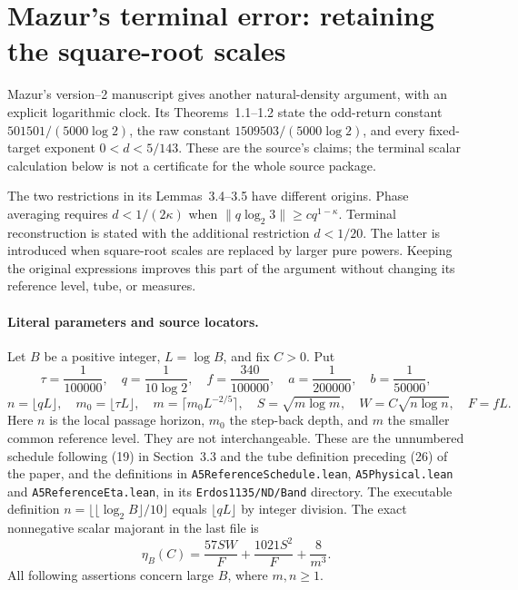 \documentclass[11pt]{article}
\theoremstyle{remark}\newtheorem{remark}[proposition]{Remark}
\begin{document}
\section{Mazur's terminal error: retaining the square-root scales}
\label{sec:mazur-terminal}

Mazur's version--2 manuscript \cite{Mazur2026v2} gives another
natural-density argument, with an explicit logarithmic clock. Its
Theorems~1.1--1.2 state the odd-return constant
$501501/(5000\log2)$, the raw constant $1509503/(5000\log2)$,
and every fixed-target exponent $0<d<5/143$. These are the source's
claims; the terminal scalar calculation below is not a certificate
for the whole source package.

The two restrictions in its Lemmas~3.4--3.5 have different origins.
Phase averaging requires $d<1/(2\kappa)$ when
$\|q\log_2 3\|\ge c q^{1-\kappa}$. Terminal reconstruction is
stated with the additional restriction $d<1/20$. The latter is
introduced when square-root scales are replaced by larger pure
powers. Keeping the original expressions improves this part of
the argument without changing its reference level, tube, or measures.

\paragraph{Literal parameters and source locators.}
Let $B$ be a positive integer, $L=\log B$, and fix $C>0$. Put
\[
 \tau=\frac1{100000},\quad q=\frac1{10\log2},\quad
 f=\frac{340}{100000},\quad
 a=\frac1{200000},\quad b=\frac1{50000},
\]
\[
 n=\lfloor qL\rfloor,\quad m_0=\lfloor\tau L\rfloor,\quad
 m=\lceil m_0L^{-2/5}\rceil,\quad
 S=\sqrt{m\log m},\quad W=C\sqrt{n\log n},\quad F=fL.
\]
Here $n$ is the local passage horizon, $m_0$ the step-back
depth, and $m$ the smaller common reference level. They are not
interchangeable. These are the unnumbered schedule following (19)
in Section~3.3 and the tube definition preceding (26) of the paper,
and the definitions in
\texttt{A5ReferenceSchedule.lean}, \texttt{A5Physical.lean}
and \texttt{A5ReferenceEta.lean}, in its
\texttt{Erdos1135/ND/Band} directory.
The executable definition $n=\lfloor\lfloor\log_2 B\rfloor/10\rfloor$
equals $\lfloor qL\rfloor$ by integer division.
The exact nonnegative scalar majorant in the last file is
\begin{equation}
 \eta_B(C)=\frac{57SW}{F}+\frac{1021S^2}{F}+\frac8{m^3}.
 \label{eq:mazur-eta}
\end{equation}
All following assertions concern large $B$, where $m,n\ge1$.
\end{document}
